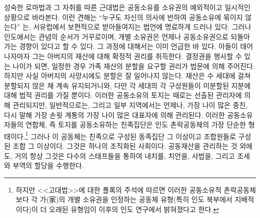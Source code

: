 성숙한 로마법과 그 자취를 따른 근대법은
공동소유를 소유권의 예외적이고 일시적인 상황으로 바라본다.
이런 견해는
``누구도 자신의 의사에 반하여 공동소유에 묶이지 않는다''%
는,
서유럽에서 보편적으로 받아들여지는 법언에 명료하게 드러나 있다.
그러나 인도에서는
관념의 순서가 거꾸로이며,
개별 소유권은 언제나 공동소유권으로 되돌아가는 경향이 있다고 할 수 있다.
그 과정에 대해서는 이미 언급한 바 있다.
아들이 태어나자마자
그는 아버지의 재산에 대해 확정적 권리를 취득한다.
결정권을 행사할 수 있는 나이가 되면,
일정한 경우
가족 재산의 분할을 요구할 권리가
법문에 의해 주어진다.
하지만 사실
아버지의 사망시에도 분할은 잘 일어나지 않는다.
재산은 수 세대에 걸쳐 분할되지 않은 채 계속 유지되거니와,
다만
각 세대의 각 구성원들이 미분할된 지분에 대해 법적 권리를 가질 뿐이다.
이러한 공동소유의 토지는 때로는 선출된 관리자에 의해 관리되지만,
일반적으로는, 그리고 일부 지역에서는 언제나,
가장 나이 많은 종친, 다시 말해
가장 손윗 계통의 가장 나이 많은 대표자에 의해 관리된다.
이러한 공동소유자들의 연합체, 즉
토지를 공동소유하는 친족집단은
인도 촌락공동체의 가장 단순한 형태이다.\footnote{%
  하지만 <<고대법>>에 대한 폴록의 주석에 따르면
  이러한 공동소유적 촌락공동체보다
  각 가(家)의 개별 소유권을 인정하는
  공동체 유형(특히 인도 북부에서 지배적이다)이
  더 오래된 유형임이 이후의 인도 연구에서 밝혀졌다고 한다.
  }
그러나
이 공동체는 친족으로 구성된 동족집단 그 이상이고
조합원들로 구성된 조합 그 이상이다.
그것은 하나의 조직화된 사회이다.
공동재산을 관리하는 것 외에도,
거의 항상 그것은 다수의 스태프들을 통하여
내치를,
치안을,
사법을,
그리고 조세와 부역의 할당을
수행한다.

